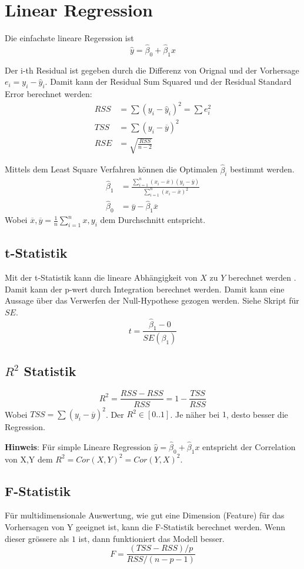 \section{Linear Regression}
Die einfachste lineare Regerssion ist
\[
\hat{y} = \hat{\beta}_0 + \hat{\beta}_1x
\]

Der i-th Residual ist gegeben durch die Differenz von Orignal und der Vorhersage $e_i = y_i - \hat{y}_i$. Damit kann der Residual Sum Squared und der Residual Standard Error berechnet werden:
\begin{align*}
	RSS &= \sum( y_i - \hat{y}_i)^2 = \sum e_i^2\\
	TSS &= \sum(y_i - \overline{y})^2 \\
	RSE &= \sqrt{\frac{RSS}{n-2}}
\end{align*}

Mittels dem Least Square Verfahren können die Optimalen $\hat{\beta}_i$ bestimmt werden.
\begin{align*}
	\hat{\beta}_1 &= \frac{\sum_{i=1}^{n}(x_i - \overline{x})(y_i - \overline{y})}{\sum_{i=1}^{n}(x_i - \overline{x})^2} \\
	\hat{\beta}_0 &= \overline{y} - \hat{\beta}_1\overline{x}
\end{align*}
Wobei $\overline{x}, \overline{y} = \frac{1}{n}\sum_{i=1}^{n}x,y_i$ dem Durchschnitt entspricht. 


\subsection{t-Statistik}
Mit der t-Statistik kann die lineare Abhängigkeit von $X$ zu $Y$ berechnet werden . Damit kann der p-wert durch Integration berechnet werden. Damit kann eine Aussage über das Verwerfen der Null-Hypothese gezogen werden. Siehe Skript für $SE$.
\[
t = \frac{\hat{\beta}_1 - 0}{SE(\beta_1)}
\]

\subsection{$R^2$ Statistik}
\[
R^2 = \frac{RSS - RSS}{RSS} = 1 - \frac{TSS}{RSS}
\]
Wobei $TSS = \sum(y_i - \overline{y})^2$. Der $R^2 \in [0..1]$. Je näher bei $1$, desto besser die Regression. 


\textbf{Hinweis}: Für simple Lineare Regression $\hat{y} = \hat{\beta}_0 + \hat{\beta}_1x$ entspricht der Correlation von X,Y dem $R^2 = Cor(X, Y)^2 = Cor(Y, X)^2$.

\subsection{F-Statistik}
Für multidimensionale Auswertung, wie gut eine Dimension (Feature) für das Vorhersagen von Y geeignet ist, kann die F-Statistik berechnet werden. Wenn dieser grössere als $1$ ist, dann funktioniert das Modell besser.
\[
F = \frac{(TSS - RSS)/p}{RSS/(n - p - 1)}
\]


